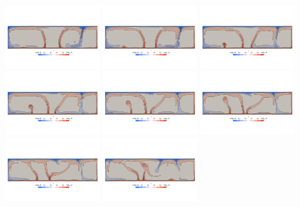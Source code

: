 \begin{center}
\includegraphics[width=3.5cm]{python_codes/fieldstone_88/results/model1/T0007.png}
\includegraphics[width=3.5cm]{python_codes/fieldstone_88/results/model1/T0008.png}
\includegraphics[width=3.5cm]{python_codes/fieldstone_88/results/model1/T0009.png}\\
\includegraphics[width=3.5cm]{python_codes/fieldstone_88/results/model1/T0010.png}
\includegraphics[width=3.5cm]{python_codes/fieldstone_88/results/model1/T0011.png}
\includegraphics[width=3.5cm]{python_codes/fieldstone_88/results/model1/T0012.png}
\includegraphics[width=3.5cm]{python_codes/fieldstone_88/results/model1/T0013.png}
\includegraphics[width=3.5cm]{python_codes/fieldstone_88/results/model1/T0014.png}\\

\end{center}
